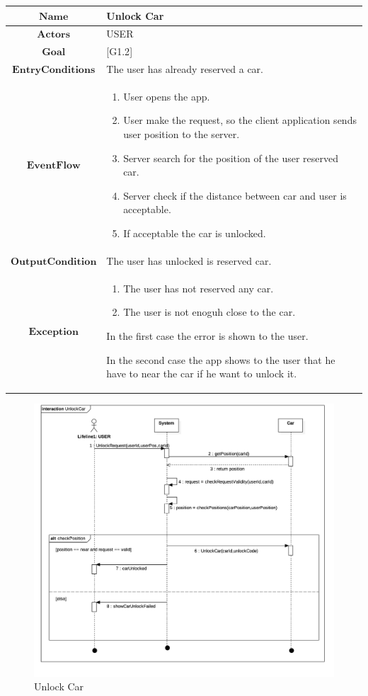 \begin{tabular}{|c|>{\raggedright}p{10cm}|}
\hline 
$\boldsymbol{\mathbf{Name}}$ & Unlock Car\tabularnewline
\hline 
$\mathbf{Actors}$ & USER \tabularnewline
\hline 
$\mathbf{Goal}$ & {[}G1.2{]}\tabularnewline
\hline 
$\mathbf{EntryConditions}$ & The user has already reserved a car.\tabularnewline
\hline 
$\mathbf{EventFlow}$ & \begin{enumerate}
\item User opens the app.
\item User make the request, so the client application sends user position
to the server.
\item Server search for the position of the user reserved car.
\item Server check if the distance between car and user is acceptable.
\item If acceptable the car is unlocked.
\end{enumerate}
\tabularnewline
\hline 
$\mathbf{OutputCondition}$ & The user has unlocked is reserved car.\tabularnewline
\hline 
$\mathbf{Exception}$ & \begin{enumerate}
\item The user has not reserved any car.
\item The user is not enoguh close to the car.
\end{enumerate}
In the first case the error is shown to the user.

In the second case the app shows to the user that he have to near
the car if he want to unlock it.\tabularnewline
\hline 
\end{tabular}
\begin{center}
\begin{figure}[H]
\includegraphics[scale=0.25]{UML/png/Collaboration3__Interaction1__UnlockCar_3}

\caption{Unlock Car}
\end{figure}
\par\end{center}

